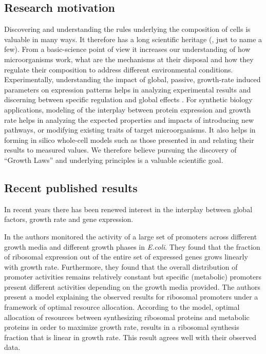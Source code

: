 \documentclass[a4page,notitlepage]{article}
\begin{document}
\subsection{Research motivation}
Discovering and understanding the rules underlying the composition of cells is valuable in many ways.
It therefore has a long scientific heritage (\cite{Schaechter1958, Maaloe1969, Bremer1987, Klumpp2009a}, just to name a few).
From a basic-science point of view it increases our understanding of how microorganisms work, what are the mechanisms at their disposal and how they regulate their composition to address different environmental conditions.
Experimentally, understanding the impact of global, passive, growth-rate induced parameters on expression patterns helps in analyzing experimental results and discerning between specific regulation and global effects \parencite{loven2012}.
For synthetic biology applications, modeling of the interplay between protein expression and growth rate helps in analyzing the expected properties and impacts of introducing new pathways, or modifying existing traits of target microorganisms.
It also helps in forming in silico whole-cell models such as those presented in \parencite{Lerman2012,Karr2012} and relating their results to measured values.
We therefore believe pursuing the discovery of ``Growth Laws'' \parencite{Scott2010b} and underlying principles is a valuable scientific goal.

\subsection{Recent published results}
In recent years there has been renewed interest in the interplay between global factors, growth rate and gene expression.

In \parencite{Zaslaver2009a} the authors monitored the activity of a large set of promoters across different growth media and different growth phases in \emph{E.coli}.
They found that the fraction of ribosomal expression out of the entire set of expressed genes grows linearly with growth rate.
Furthermore, they found that the overall distribution of promoter activities remains relatively constant but specific (metabolic) promoters present different activities depending on the growth media provided.
The authors present a model explaining the observed results for ribosomal promoters under a framework of optimal resource allocation.
According to the model, optimal allocation of resources between synthesizing ribosomal proteins and metabolic proteins in order to maximize growth rate, results in a ribosomal synthesis fraction that is linear in growth rate.
This result agrees well with their observed data.
\end{document}
